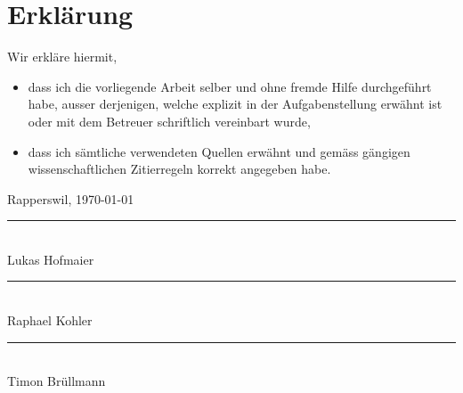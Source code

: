 \chapter*{Erklärung}
\label{cha:declaration}


Wir erkläre hiermit,
\begin{itemize}
\item dass ich die vorliegende Arbeit selber und ohne fremde Hilfe durchgeführt habe, ausser derjenigen, welche explizit in der Aufgabenstellung erwähnt ist oder mit dem Betreuer schriftlich vereinbart wurde,
\item dass ich sämtliche verwendeten Quellen erwähnt und gemäss gängigen wissenschaftlichen Zitierregeln korrekt angegeben habe.
\end{itemize}

\vspace{1cm}

\noindent
Rapperswil, \today

\vspace{1.5cm}

\noindent
\rule{6cm}{0.4pt}
\noindent
\vspace{0.5cm} \\
Lukas Hofmaier


\vspace{1.5cm}

\noindent
\rule{6cm}{0.4pt}
\noindent
\vspace{0.5cm} \\
Raphael Kohler


\vspace{1.5cm}

\noindent
\rule{6cm}{0.4pt}
\noindent
\vspace{0.5cm} \\
Timon Brüllmann